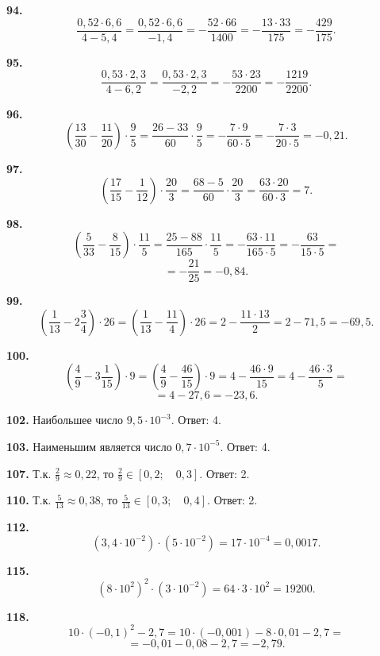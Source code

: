 \textbf{94.} $$\frac{0,52\cdot6,6}{4-5,4}=\frac{0,52\cdot6,6}{-1,4}=-\frac{52\cdot66}{1400}=-\frac{13\cdot33}{175}=-\frac{429}{175}.$$

\textbf{95.} $$\frac{0,53\cdot2,3}{4-6,2}=\frac{0,53\cdot2,3}{-2,2}=-\frac{53\cdot23}{2200}=-\frac{1219}{2200}.$$

\textbf{96.} $$\left(\frac{13}{30}-\frac{11}{20}\right)\cdot\frac{9}{5}=\frac{26-33}{60}\cdot\frac{9}{5}=-\frac{7\cdot9}{60\cdot5}=-\frac{7\cdot3}{20\cdot5}=-0,21.$$

\textbf{97.} $$\left(\frac{17}{15}-\frac{1}{12}\right)\cdot\frac{20}{3}=\frac{68-5}{60}\cdot\frac{20}{3}=\frac{63\cdot20}{60\cdot3}=7.$$

\textbf{98.} $$\left(\frac{5}{33}-\frac{8}{15}\right)\cdot\frac{11}{5}=\frac{25-88}{165}\cdot\frac{11}{5}=-\frac{63\cdot11}{165\cdot5}=-\frac{63}{15\cdot5}=$$ $$=-\frac{21}{25}=-0,84.$$

 \textbf{99.} $$\left(\frac{1}{13}-2\frac{3}{4}\right)\cdot26=\left(\frac{1}{13}-\frac{11}{4}\right)\cdot26=2-\frac{11\cdot13}{2}=2-71,5=-69,5.$$

\newpage \textbf{100.} $$\left(\frac{4}{9}-3\frac{1}{15}\right)\cdot9=\left(\frac{4}{9}-\frac{46}{15}\right)\cdot9=4-\frac{46\cdot9}{15}=4-\frac{46\cdot3}{5}=$$ $$=4-27,6=-23,6.$$

\textbf{102.} Наибольшее число $9,5\cdot10^{-3}$. \newline \null \hspace*{\fill} Ответ: 4. 

\textbf{103.} Наименьшим является число $0,7\cdot10^{-5}$. \newline \null \hspace*{\fill} Ответ: 4. 

\textbf{107.} Т.к. $\frac{2}{9}\approx0,22$, то $\frac{2}{9}\in[0,2;\quad0,3]$. \newline \null \hspace*{\fill} Ответ: 2. 

\textbf{110.} Т.к. $\frac{5}{13}\approx0,38$, то $\frac{5}{13}\in[0,3;\quad0,4]$.  Ответ: 2. 

\textbf{112.} $$\left(3,4\cdot10^{-2}\right)\cdot\left(5\cdot10^{-2}\right)=17\cdot10^{-4}=0,0017.$$

\textbf{115.} $$\left(8\cdot10^2\right)^2\cdot\left(3\cdot10^{-2}\right)=64\cdot3\cdot10^2=19200.$$

\textbf{118.} $$10\cdot\left(-0,1\right)^2-2,7=10\cdot\left(-0,001\right)-8\cdot0,01-2,7=$$ $$=-0,01-0,08-2,7=-2,79.$$    

